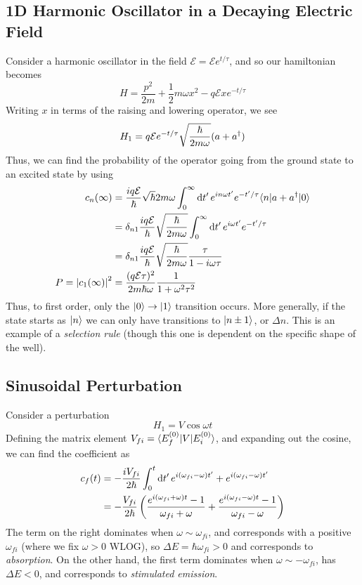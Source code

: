 \subsection{1D Harmonic Oscillator in a Decaying Electric Field}
Consider a harmonic oscillator in the field \(\mathcal E = \mathcal E e^{t/\tau}\), and so our hamiltonian becomes
\[H = \frac{p^2}{2m} +\frac{1}{2}m\omega x^2 - q\mathcal E x e^{-t/\tau}\]
Writing \(x\) in terms of the raising and lowering operator, we see
\[H_1 = q\mathcal E e^{-t/\tau}\sqrt{\frac{\hbar}{2m\omega}}(a+a^{\dagger})\]
Thus, we can find the probability of the operator going from the ground state to an excited state by using
\begin{align*}
	c_n(\infty) &= \frac{iq\mathcal E}{\hbar}\sqrt{\hbar}{2m\omega}\int_0^\infty\d{t'} e^{in\omega t'}e^{-t'/\tau}\b{n} a+a\adj\k{0}\\
	&=\delta_{n1}\frac{iq\mathcal E}{\hbar}\sqrt{\frac{\hbar}{2m\omega}}\int_0^\infty\d{t'} e^{i\omega t'}e^{-t'/\tau}\\
	&=\delta_{n1} \frac{iq\mathcal E}{\hbar}\sqrt{\frac{\hbar}{2m\omega}}\frac{\tau}{1-i\omega\tau}\\
	P = \abs{c_1(\infty)}^2  &= \frac{(q\mathcal E \tau)^2}{2m\hbar\omega}\frac{1}{1+\omega^2 \tau^2}
\end{align*}
Thus, to first order, only the \(\lvert0\rangle\rightarrow \lvert1\rangle\) transition occurs. More generally, if the state starts as \(\lvert n\rangle\) we can only have transitions to \(\lvert n\pm 1\rangle\), or \(\Delta n\). This is an example of a \emph{selection rule} (though this one is dependent on the specific shape of the well).

\subsection{Sinusoidal Perturbation}
Consider a perturbation
\[H_1 = V\cos\omega t\]
Defining the matrix element \(V_{fi} = \langle E_f^{(0)}\rvert V\lvert E_i^{(0)}\rangle\), and expanding out the cosine, we can find the coefficient as
\begin{align*}
	c_f(t) &= -\frac{iV_{fi}}{2\hbar}\int_0^t \d{t'} e^{i(\omega_{fi}-\omega)t'}+e^{i(\omega_{fi}-\omega)t'}\\
	       &=-\frac{V_{fi}}{2\hbar}\left(\frac{e^{i(\omega_{fi}+\omega)t}-1}{\omega_{fi}+\omega} + \frac{e^{i(\omega_{fi}-\omega)t}-1}{\omega_{fi}-\omega}\right)
\end{align*}
The term on the right dominates when \(\omega\sim\omega_{fi}\), and corresponds with a positive \(\omega_{fi}\) (where we fix \(\omega>0\) WLOG), so \(\Delta E = \hbar \omega_{fi}>0\) and corresponds to \emph{absorption}. On the other hand, the first term dominates when \(\omega\sim -\omega_{fi}\), has \(\Delta E<0\), and corresponds to \emph{stimulated emission}.

